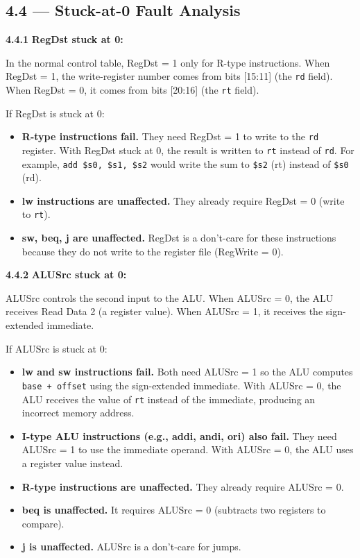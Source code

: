 \subsection*{4.4 --- Stuck-at-0 Fault Analysis}
\hypertarget{sol-4.4}{}

\medskip\noindent\textbf{4.4.1}
\textbf{RegDst stuck at 0:}

In the normal control table, RegDst = 1 only for R-type instructions.
When RegDst = 1, the write-register number comes from bits [15:11] (the
\texttt{rd} field).  When RegDst = 0, it comes from bits [20:16] (the
\texttt{rt} field).

If RegDst is stuck at 0:
\begin{itemize}
  \item \textbf{R-type instructions fail.}  They need RegDst = 1 to write
        to the \texttt{rd} register.  With RegDst stuck at 0, the result is
        written to \texttt{rt} instead of \texttt{rd}.  For example,
        \texttt{add \$s0, \$s1, \$s2} would write the sum to \texttt{\$s2}
        (rt) instead of \texttt{\$s0} (rd).
  \item \textbf{lw instructions are unaffected.}  They already require
        RegDst = 0 (write to \texttt{rt}).
  \item \textbf{sw, beq, j are unaffected.}  RegDst is a don't-care for
        these instructions because they do not write to the register file
        (RegWrite = 0).
\end{itemize}

\medskip\noindent\textbf{4.4.2}
\textbf{ALUSrc stuck at 0:}

ALUSrc controls the second input to the ALU.  When ALUSrc = 0, the ALU
receives Read Data 2 (a register value).  When ALUSrc = 1, it receives the
sign-extended immediate.

If ALUSrc is stuck at 0:
\begin{itemize}
  \item \textbf{lw and sw instructions fail.}  Both need ALUSrc = 1 so the
        ALU computes \texttt{base + offset} using the sign-extended
        immediate.  With ALUSrc = 0, the ALU receives the value of
        \texttt{rt} instead of the immediate, producing an incorrect memory
        address.
  \item \textbf{I-type ALU instructions (e.g., addi, andi, ori) also fail.}
        They need ALUSrc = 1 to use the immediate operand.  With ALUSrc = 0,
        the ALU uses a register value instead.
  \item \textbf{R-type instructions are unaffected.}  They already require
        ALUSrc = 0.
  \item \textbf{beq is unaffected.}  It requires ALUSrc = 0 (subtracts
        two registers to compare).
  \item \textbf{j is unaffected.}  ALUSrc is a don't-care for jumps.
\end{itemize}

